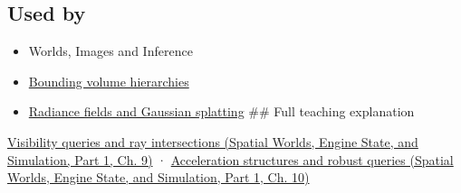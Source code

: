 \subsection{Used by}\label{appendix-47ac1bd6d144-used-by}

\hypertarget{appendix-47ac1bd6d144-used-by}{}

\begin{itemize}
\item
  {Worlds, Images and Inference}
\item
  \hyperref[appendix-0b426c47dd78]{Bounding volume hierarchies}
\item
  \hyperref[appendix-c5b332e400e7]{Radiance fields and Gaussian splatting} \#\# Full teaching explanation
\end{itemize}

\href{../05-Spatial-Worlds-Engine-State-and-Simulation-P01/main.pdf\#04-visual-computing-ii-ch028-visibility-queries-and-ray-intersections-1}{Visibility queries and ray intersections (Spatial Worlds, Engine State, and Simulation, Part 1, Ch. 9)} · \href{../05-Spatial-Worlds-Engine-State-and-Simulation-P01/main.pdf\#04-visual-computing-ii-ch029-acceleration-structures-and-robust-queries-1}{Acceleration structures and robust queries (Spatial Worlds, Engine State, and Simulation, Part 1, Ch. 10)}
